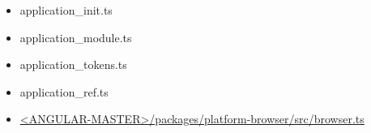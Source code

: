 












\begin{itemize}
  \item application\_init.ts
  \item application\_module.ts
  \item application\_tokens.ts
  \item application\_ref.ts
\end{itemize}






\begin{itemize}
  \item \href{https://github.com/angular/angular/blob/master/packages/platform-browser/src/browser.ts}
        {<ANGULAR-MASTER>/packages/platform-browser/src/browser.ts}
\end{itemize}


